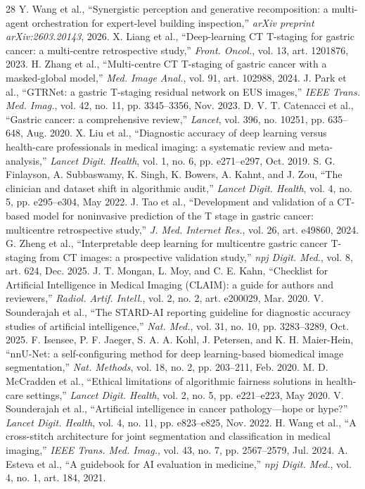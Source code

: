 \documentclass[11pt,a4paper]{article}
\begin{document}
\begin{thebibliography}{28}
 Y. Wang et al., ``Synergistic perception and generative recomposition: a multi-agent orchestration for expert-level building inspection,'' \emph{arXiv preprint arXiv:2603.20143}, 2026.
 X. Liang et al., ``Deep-learning CT T-staging for gastric cancer: a multi-centre retrospective study,'' \emph{Front. Oncol.}, vol. 13, art. 1201876, 2023.
 H. Zhang et al., ``Multi-centre CT T-staging of gastric cancer with a masked-global model,'' \emph{Med. Image Anal.}, vol. 91, art. 102988, 2024.
 J. Park et al., ``GTRNet: a gastric T-staging residual network on EUS images,'' \emph{IEEE Trans. Med. Imag.}, vol. 42, no. 11, pp. 3345--3356, Nov. 2023.
 D. V. T. Catenacci et al., ``Gastric cancer: a comprehensive review,'' \emph{Lancet}, vol. 396, no. 10251, pp. 635--648, Aug. 2020.
 X. Liu et al., ``Diagnostic accuracy of deep learning versus health-care professionals in medical imaging: a systematic review and meta-analysis,'' \emph{Lancet Digit. Health}, vol. 1, no. 6, pp. e271--e297, Oct. 2019.
 S. G. Finlayson, A. Subbaswamy, K. Singh, K. Bowers, A. Kahnt, and J. Zou, ``The clinician and dataset shift in algorithmic audit,'' \emph{Lancet Digit. Health}, vol. 4, no. 5, pp. e295--e304, May 2022.
 J. Tao et al., ``Development and validation of a CT-based model for noninvasive prediction of the T stage in gastric cancer: multicentre retrospective study,'' \emph{J. Med. Internet Res.}, vol. 26, art. e49860, 2024.
 G. Zheng et al., ``Interpretable deep learning for multicentre gastric cancer T-staging from CT images: a prospective validation study,'' \emph{npj Digit. Med.}, vol. 8, art. 624, Dec. 2025.
 J. T. Mongan, L. Moy, and C. E. Kahn, ``Checklist for Artificial Intelligence in Medical Imaging (CLAIM): a guide for authors and reviewers,'' \emph{Radiol. Artif. Intell.}, vol. 2, no. 2, art. e200029, Mar. 2020.
 V. Sounderajah et al., ``The STARD-AI reporting guideline for diagnostic accuracy studies of artificial intelligence,'' \emph{Nat. Med.}, vol. 31, no. 10, pp. 3283--3289, Oct. 2025.
 F. Isensee, P. F. Jaeger, S. A. A. Kohl, J. Petersen, and K. H. Maier-Hein, ``nnU-Net: a self-configuring method for deep learning-based biomedical image segmentation,'' \emph{Nat. Methods}, vol. 18, no. 2, pp. 203--211, Feb. 2020.
 M. D. McCradden et al., ``Ethical limitations of algorithmic fairness solutions in health-care settings,'' \emph{Lancet Digit. Health}, vol. 2, no. 5, pp. e221--e223, May 2020.
 V. Sounderajah et al., ``Artificial intelligence in cancer pathology---hope or hype?'' \emph{Lancet Digit. Health}, vol. 4, no. 11, pp. e823--e825, Nov. 2022.
 H. Wang et al., ``A cross-stitch architecture for joint segmentation and classification in medical imaging,'' \emph{IEEE Trans. Med. Imag.}, vol. 43, no. 7, pp. 2567--2579, Jul. 2024.
 A. Esteva et al., ``A guidebook for AI evaluation in medicine,'' \emph{npj Digit. Med.}, vol. 4, no. 1, art. 184, 2021.


\end{thebibliography}
\end{document}
